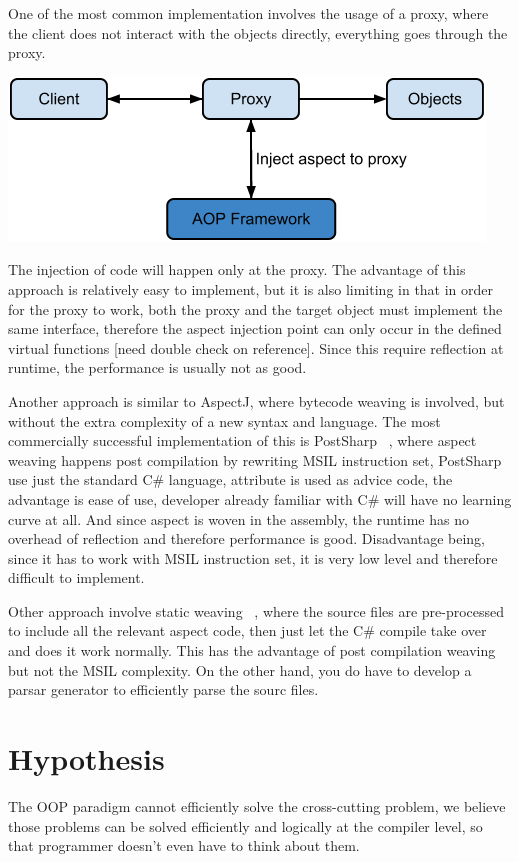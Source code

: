 One of the most common implementation involves the usage of a proxy, where the client does not interact with the objects directly, everything goes through the proxy.

\includegraphics[scale=0.70]{proxy.png}

The injection of code will happen only at the proxy. The advantage of this approach is relatively easy to implement, but it is also limiting in that in order for the proxy to work, both the proxy and the target object must implement the same interface, therefore the aspect injection point can only occur in the defined virtual functions [need double check on reference]. Since this require reflection at runtime, the performance is usually not as good.

Another approach is similar to AspectJ, where bytecode weaving is involved, but without the extra complexity of a new syntax and language. The most commercially successful implementation of this is PostSharp ~\cite{postsharp}, where aspect weaving happens post compilation by rewriting MSIL instruction set, PostSharp use just the standard C\# language, attribute is used as advice code, the advantage is ease of use, developer already familiar with C\# will have no learning curve at all. And since aspect is woven in the assembly, the runtime has no overhead of reflection and therefore performance is good. Disadvantage being, since it has to work with MSIL instruction set, it is very low level and therefore difficult to implement.

Other approach involve static weaving ~\cite{aspectcs}, where the source files are pre-processed to include all the relevant aspect code, then just let the C\# compile take over and does it work normally. This has the advantage of post compilation weaving but not the MSIL complexity. On the other hand, you do have to develop a parsar generator to efficiently parse the sourc files.

\section{Hypothesis}
The OOP paradigm cannot efficiently solve the cross-cutting problem, we believe those problems can be solved efficiently and logically at the compiler level, so that programmer doesn't even have to think about them.

